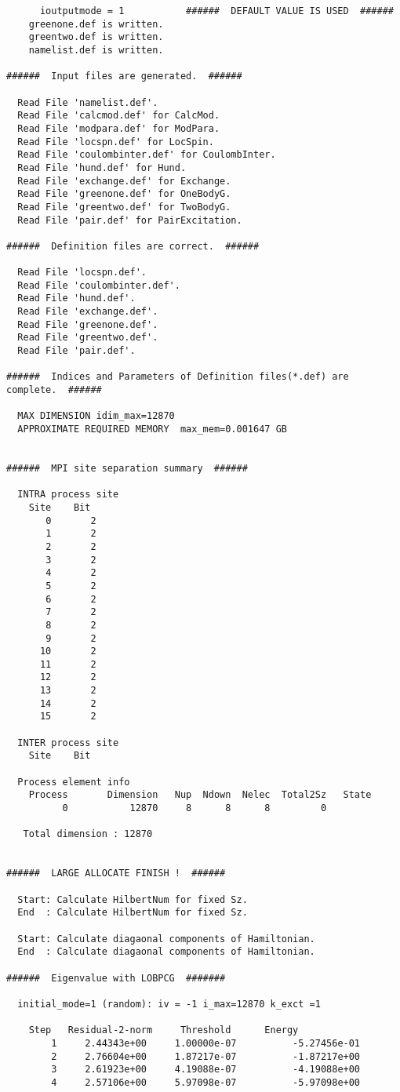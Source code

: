 \begin{verbatim}
      ioutputmode = 1           ######  DEFAULT VALUE IS USED  ######
    greenone.def is written.
    greentwo.def is written.
    namelist.def is written.

######  Input files are generated.  ######

  Read File 'namelist.def'.
  Read File 'calcmod.def' for CalcMod.
  Read File 'modpara.def' for ModPara.
  Read File 'locspn.def' for LocSpin.
  Read File 'coulombinter.def' for CoulombInter.
  Read File 'hund.def' for Hund.
  Read File 'exchange.def' for Exchange.
  Read File 'greenone.def' for OneBodyG.
  Read File 'greentwo.def' for TwoBodyG.
  Read File 'pair.def' for PairExcitation.

######  Definition files are correct.  ######

  Read File 'locspn.def'.
  Read File 'coulombinter.def'.
  Read File 'hund.def'.
  Read File 'exchange.def'.
  Read File 'greenone.def'.
  Read File 'greentwo.def'.
  Read File 'pair.def'.

######  Indices and Parameters of Definition files(*.def) are complete.  ######

  MAX DIMENSION idim_max=12870
  APPROXIMATE REQUIRED MEMORY  max_mem=0.001647 GB


######  MPI site separation summary  ######

  INTRA process site
    Site    Bit
       0       2
       1       2
       2       2
       3       2
       4       2
       5       2
       6       2
       7       2
       8       2
       9       2
      10       2
      11       2
      12       2
      13       2
      14       2
      15       2

  INTER process site
    Site    Bit

  Process element info
    Process       Dimension   Nup  Ndown  Nelec  Total2Sz   State
          0           12870     8      8      8         0

   Total dimension : 12870


######  LARGE ALLOCATE FINISH !  ######

  Start: Calculate HilbertNum for fixed Sz.
  End  : Calculate HilbertNum for fixed Sz.

  Start: Calculate diagaonal components of Hamiltonian.
  End  : Calculate diagaonal components of Hamiltonian.

######  Eigenvalue with LOBPCG  #######

  initial_mode=1 (random): iv = -1 i_max=12870 k_exct =1

    Step   Residual-2-norm     Threshold      Energy
        1     2.44343e+00     1.00000e-07          -5.27456e-01
        2     2.76604e+00     1.87217e-07          -1.87217e+00
        3     2.61923e+00     4.19088e-07          -4.19088e+00
        4     2.57106e+00     5.97098e-07          -5.97098e+00
\end{verbatim}
